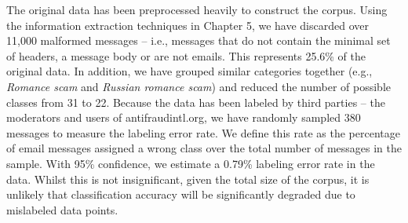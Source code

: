 The original data has been preprocessed heavily to construct the corpus. Using the information extraction techniques in Chapter 5, we have discarded over 11,000 malformed messages -- i.e., messages that do not contain the minimal set of headers, a message body or are not emails. This represents 25.6\% of the original data. In addition, we have grouped similar categories together (e.g., \textit{Romance scam} and \textit{Russian romance scam}) and reduced the number of possible classes from 31 to 22. Because the data has been labeled by third parties -- the moderators and users of antifraudintl.org, we have randomly sampled 380 messages to measure the labeling error rate. We define this rate as the percentage of email messages assigned a wrong class over the total number of messages in the sample. With 95\% confidence, we estimate a 0.79\% labeling error rate in the data. Whilst this is not insignificant, given the total size of the corpus, it is unlikely that classification accuracy will be significantly degraded due to mislabeled data points. 


\begin{table}
  \centering
\caption{Corpus statistics}
\end{table} 

